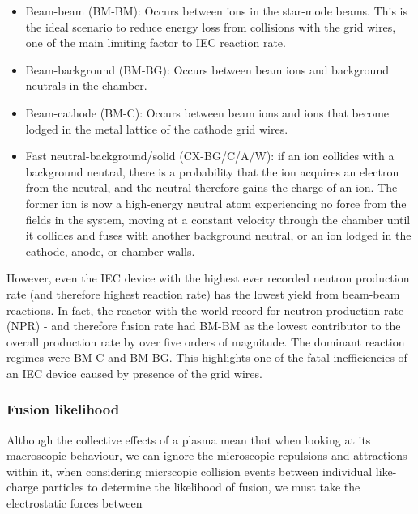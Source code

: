 \documentclass[a4paper,titlepage]{article}
\let\cite\parencite
\begin{document}
\begin{flushleft}
\begin{itemize}
    \item Beam-beam (BM-BM): Occurs between ions in the star-mode beams. This is the ideal scenario to reduce energy loss from collisions with the grid wires, one of the main limiting factor to IEC reaction rate. 
    \item Beam-background (BM-BG): Occurs between beam ions and background neutrals in the chamber. 
    \item Beam-cathode (BM-C): Occurs between beam ions and ions that become lodged in the metal lattice of the cathode grid wires.
    \item Fast neutral-background/solid (CX-BG/C/A/W): if an ion collides with a background neutral, there is a probability that the ion acquires an electron from the neutral, and the neutral therefore gains the charge of an ion. The former ion is now a high-energy neutral atom experiencing no force from the fields in the system, moving at a constant velocity through the chamber until it collides and fuses with another background neutral, or an ion lodged in the cathode, anode, or chamber walls. 
\end{itemize}

However, even the IEC device with the highest ever recorded neutron production rate (and therefore highest reaction rate) has the lowest yield from beam-beam reactions. In fact, the reactor with the world record for neutron production rate (NPR) - and therefore fusion rate \cite{tomiyasu_2009_effects} had BM-BM as the lowest contributor to the overall production rate by over five orders of magnitude. The dominant reaction regimes were BM-C and BM-BG. This highlights  one of the fatal inefficiencies of an IEC device caused by presence of the grid wires. 

\subsubsection{Fusion likelihood}
\label{cross_section}

Although the collective effects of a plasma mean that when looking at its macroscopic behaviour, we can ignore the microscopic repulsions and attractions within it, when considering micrscopic collision events between individual like-charge particles to determine the likelihood of fusion, we must take the electrostatic forces between  


\end{flushleft}
\end{document}
